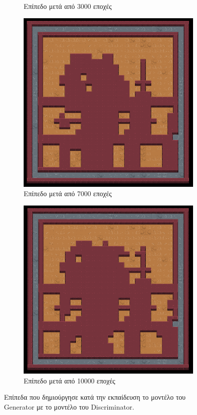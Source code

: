 \begin{figure}[H]
\begin{subfigure}{.5\textwidth}
  \caption{Επίπεδο μετά από 3000 εποχές}
  \label{fig:sfig2}
\end{subfigure}
\begin{subfigure}{.5\textwidth}
  \centering
  \includegraphics[width=.8\linewidth]{../images/result_images/dense-gan/generator_7000.png}
  \caption{Επίπεδο μετά από 7000 εποχές}
  \label{fig:sfig2}
\end{subfigure}
\begin{subfigure}{.5\textwidth}
  \centering
  \includegraphics[width=.8\linewidth]{../images/result_images/dense-gan/generator_10000.png}
  \caption{Επίπεδο μετά από 10000 εποχές}
  \label{fig:sfig2}
\end{subfigure}
\caption{Επίπεδα που δημιούργησε κατά την εκπαίδευση το μοντέλο του Generator με το μοντέλο του Discriminator.}
\label{fig:fig}
\end{figure}


